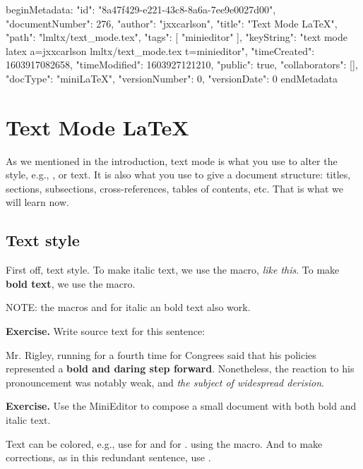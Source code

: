 beginMetadata:
{
    "id": "8a47f429-e221-43c8-8a6a-7ee9e0027d00",
    "documentNumber": 276,
    "author": "jxxcarlson",
    "title": "Text Mode LaTeX",
    "path": "lmltx/text_mode.tex",
    "tags": [
        "minieditor"
    ],
    "keyString": "text mode latex a=jxxcarlson lmltx/text_mode.tex t=minieditor",
    "timeCreated": 1603917082658,
    "timeModified": 1603927121210,
    "public": true,
    "collaborators": [],
    "docType": "miniLaTeX",
    "versionNumber": 0,
    "versionDate": 0
}
endMetadata

\setcounter{section}{3}

\section{Text Mode LaTeX}

\innertableofcontents

As we mentioned in the introduction, text mode is what you use to alter the style, e.g., ,  or  text.  It is also what you use to give a document structure: titles, sections, subsections, cross-references, tables of contents, etc. That is what we will learn now.


\subsection{Text style}

First off, text style.  To make italic text, we use the  macro, \emph{like this}.   To make \textbf{bold text}, we use the  macro.   

NOTE: the macros  and  for italic an bold text also work.

\textbf{Exercise.} Write source text for this sentence: 

\begin{indent}
Mr. Rigley, running for a fourth time for Congrees said that his policies represented a \textbf{bold and daring step forward}. Nonetheless, the reaction to his pronouncement was notably weak, and \emph{the subject of widespread derision}.
\end{indent}

\textbf{Exercise.} Use the MiniEditor to compose a small document with both bold and italic text.


Text can be colored, e.g., use  for  and  for .  using the  macro.  And to make corrections, as in this  redundant  sentence, use .

